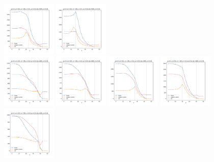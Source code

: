 \documentclass[a4paper]{article}
\begin{document}
\begin{figure}[H]
  \includegraphics[width=0.23\textwidth]{grid-v4-w3_0}
  \includegraphics[width=0.23\textwidth]{grid-v4-w4_0}
  \\
  \includegraphics[width=0.23\textwidth]{grid-v5-w1_0}
  \includegraphics[width=0.23\textwidth]{grid-v5-w2_0}
  \includegraphics[width=0.23\textwidth]{grid-v5-w3_0}
  \includegraphics[width=0.23\textwidth]{grid-v5-w4_0}
  \\
  \includegraphics[width=0.23\textwidth]{grid-v6-w1_0}

\end{figure}
\end{document}
